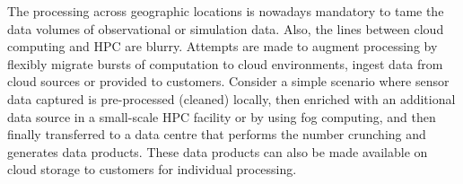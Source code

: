 \documentclass[a4paper]{article}
\begin{document}
{{The processing across geographic locations is nowadays mandatory to tame the data volumes of observational or simulation data.
Also, the lines between cloud computing and HPC are blurry. Attempts are made to augment processing by flexibly migrate bursts of computation to cloud environments, ingest data from cloud sources or provided to customers.
Consider a simple scenario where sensor data captured is pre-processed (cleaned) locally, then enriched with an additional data source in a small-scale HPC facility or by using fog computing, and then finally transferred to a data centre that performs the number crunching and generates data products.
These data products can also be made available on cloud storage to customers for individual processing.

{ }}}
\end{document}
